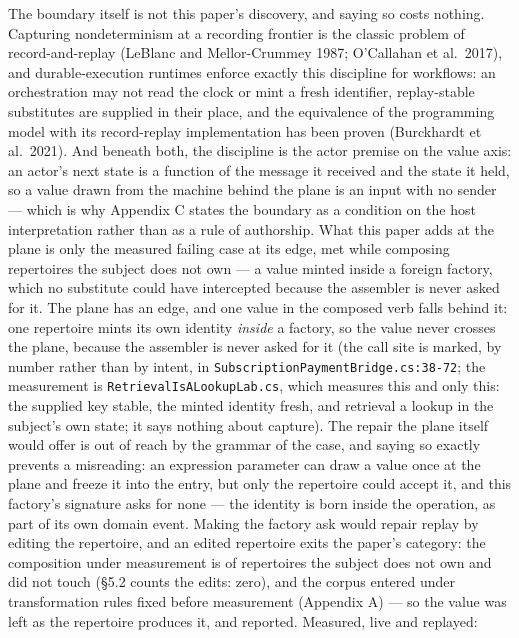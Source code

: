 \documentclass[
]{article}
\newcounter{none} %
\begin{document}
The boundary itself is not this paper's discovery, and saying so costs
nothing. Capturing nondeterminism at a recording frontier is the classic
problem of record-and-replay (LeBlanc and Mellor-Crummey 1987;
O'Callahan et al.~2017), and durable-execution runtimes enforce exactly
this discipline for workflows: an orchestration may not read the clock
or mint a fresh identifier, replay-stable substitutes are supplied in
their place, and the equivalence of the programming model with its
record-replay implementation has been proven (Burckhardt et al.~2021).
And beneath both, the discipline is the actor premise on the value axis:
an actor's next state is a function of the message it received and the
state it held, so a value drawn from the machine behind the plane is an
input with no sender --- which is why Appendix C states the boundary as
a condition on the host interpretation rather than as a rule of
authorship. What this paper adds at the plane is only the measured
failing case at its edge, met while composing repertoires the subject
does not own --- a value minted inside a foreign factory, which no
substitute could have intercepted because the assembler is never asked
for it. The plane has an edge, and one value in the composed verb falls
behind it: one repertoire mints its own identity \emph{inside} a
factory, so the value never crosses the plane, because the assembler is
never asked for it (the call site is marked, by number rather than by
intent, in \texttt{SubscriptionPaymentBridge.cs:38-72}; the measurement
is \texttt{RetrievalIsALookupLab.cs}, which measures this and only this:
the supplied key stable, the minted identity fresh, and retrieval a
lookup in the subject's own state; it says nothing about capture). The
repair the plane itself would offer is out of reach by the grammar of
the case, and saying so exactly prevents a misreading: an expression
parameter can draw a value once at the plane and freeze it into the
entry, but only the repertoire could accept it, and this factory's
signature asks for none --- the identity is born inside the operation,
as part of its own domain event. Making the factory ask would repair
replay by editing the repertoire, and an edited repertoire exits the
paper's category: the composition under measurement is of repertoires
the subject does not own and did not touch (§5.2 counts the edits:
zero), and the corpus entered under transformation rules fixed before
measurement (Appendix A) --- so the value was left as the repertoire
produces it, and reported. Measured, live and replayed:
\end{document}
